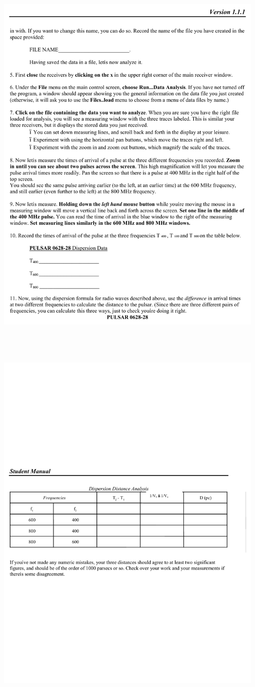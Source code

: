 \includegraphics[height=8in,trim=-2.2in -3.3in  0 1.3in]{pulsars/pulsar11.pdf}
\vfil\eject

\includegraphics[trim=-2.2in -7in 0 7in]{pulsars/pulsar12.pdf}
\vfil\eject
